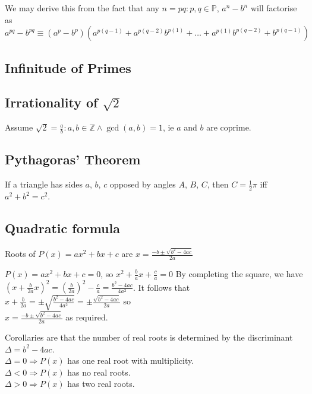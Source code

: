 \documentclass[a4paper,11pt]{article}
\begin{document}
    We may derive this from the fact that any $n = pq: p, q \in \mathbb{P}$,
    $a^n - b^n$ will factorise as
    \\$a^{pq} - b^{pq} \equiv
     (a^p - b^p)(a^{p(q - 1)} + a^{p(q - 2)}b^{p(1)} + \ldots +
                 a^{p(1)}b^{p(q - 2)} + b^{p(q - 1)})$

    \subsection{Infinitude of Primes}

    \subsection[Irrationality of $\sqrt 2$]{Irrationality of \boldmath$\sqrt 2$}

    Assume $\sqrt 2 = \frac ab : a, b \in \mathbb{Z} \land \gcd(a, b) = 1$, ie
    $a$ and $b$ are coprime.

    \subsection{Pythagoras' Theorem} \label{sec:pythagoras}


    If a triangle has sides $a$, $b$, $c$ opposed by angles $A$, $B$, $C$,
    then $C = \frac 12 \pi$ iff $a^2 + b^2 = c^2$.

    \subsection{Quadratic formula} \label{sec:quad_formula}

    Roots of $P(x) = ax^2 + bx + c$ are
    $x = \frac{-b \pm \sqrt{b^2 - 4ac}}{2a}$

    $P(x) = ax^2 + bx + c = 0$, so $x^2 + \frac{b}{a}x + \frac{c}{a} = 0$
    By completing the square, we have
    \\$(x + \frac{b}{2a}x)^2 = (\frac{b}{2a})^2 - \frac{c}{a}
    = \frac{b^2 - 4ac}{4a^2}$. It follows that
    \\$x + \frac{b}{2a} = \pm \sqrt{\frac{b^2 - 4ac}{4a^2}}
    = \pm \frac{\sqrt{b^2 - 4ac}}{2a}$ so
    \\$x = \frac{-b \pm \sqrt{b^2 - 4ac}}{2a}$ as required.

    Corollaries are that the number of real roots is determined by the
    discriminant \\$\Delta = b^2 - 4ac$.
    \\$\Delta = 0 \Rightarrow P(x)$ has one real root with multiplicity.
    \\$\Delta < 0 \Rightarrow P(x)$ has no real roots.
    \\$\Delta > 0 \Rightarrow P(x)$ has two real roots.
\end{document}
